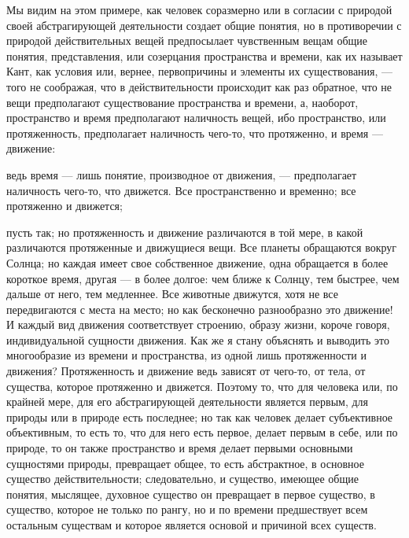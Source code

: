 \documentclass[12pt]{article}
\begin{document}
Мы видим на этом примере, как человек соразмерно или в согласии с природой своей абстрагирующей деятельности создает общие понятия, но в противоречии с природой действительных вещей предпосылает чувственным вещам общие понятия, представления, или созерцания пространства и времени, как их называет Кант, как условия или, вернее, первопричины и элементы их существования, --- того не соображая, что в действительности происходит как раз обратное, что не вещи предполагают существование пространства и времени, а, наоборот, пространство и время предполагают наличность вещей, ибо пространство, или протяженность, предполагает наличность чего-то, что протяженно, и время --- движение: 

ведь время --- лишь понятие, производное от движения, --- предполагает наличность чего-то, что движется. Все пространственно и временно; все протяженно и движется; 

пусть так; но протяженность и движение различаются в той мере, в какой различаются протяженные и движущиеся вещи. Все планеты обращаются вокруг Солнца; но каждая имеет свое собственное движение, одна обращается в более короткое время, другая --- в более долгое: чем ближе к Солнцу, тем быстрее, чем дальше от него, тем медленнее. Все животные движутся, хотя не все передвигаются с места на место; но как бесконечно разнообразно это движение! И каждый вид движения соответствует строению, образу жизни, короче говоря, индивидуальной сущности движения. Как же я стану объяснять и выводить это многообразие из времени и пространства, из одной лишь протяженности и движения? Протяженность и движение ведь зависят от чего-то, от тела, от существа, которое протяженно и движется. Поэтому то, что для человека или, по крайней мере, для его абстрагирующей деятельности является первым, для природы или в природе есть последнее; но так как человек делает субъективное объективным, то есть то, что для него есть первое, делает первым в себе, или по природе, то он также пространство и время делает первыми основными сущностями природы, превращает общее, то есть абстрактное, в основное существо действительности; следовательно, и существо, имеющее общие понятия, мыслящее, духовное существо он превращает в первое существо, в существо, которое не только по рангу, но и по времени предшествует всем остальным существам и которое является основой и причиной всех существ. 
\end{document}
